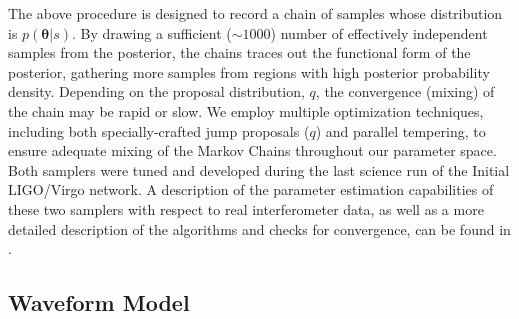 \documentclass[11pt,a4paper]{emulateapj} 
\newcommand{\thpara}{\boldsymbol{\theta}}
\begin{document}
The above procedure is designed to record a chain of samples whose
distribution is $p\left(\thpara|s\right)$.  By drawing a sufficient
($\sim1000$) number of effectively independent samples from the
posterior, the chains traces out the functional form of the posterior,
gathering more samples from regions with high posterior probability
density.  Depending on the proposal distribution, $q$, the convergence
(mixing) of the chain may be rapid or slow.  We employ multiple
optimization techniques, including both specially-crafted jump
proposals ($q$) and parallel tempering, to ensure adequate mixing of
the Markov Chains throughout our parameter space.  Both samplers were
tuned and developed during the last science run of the Initial
LIGO/Virgo network.  A description of the parameter estimation
capabilities of these two samplers with respect to real interferometer
data, as well as a more detailed description of the algorithms and
checks for convergence, can be found in \cite{S6PE}.
  
 
\subsection{Waveform Model}
\label{waveformSection}
  
\end{document}
